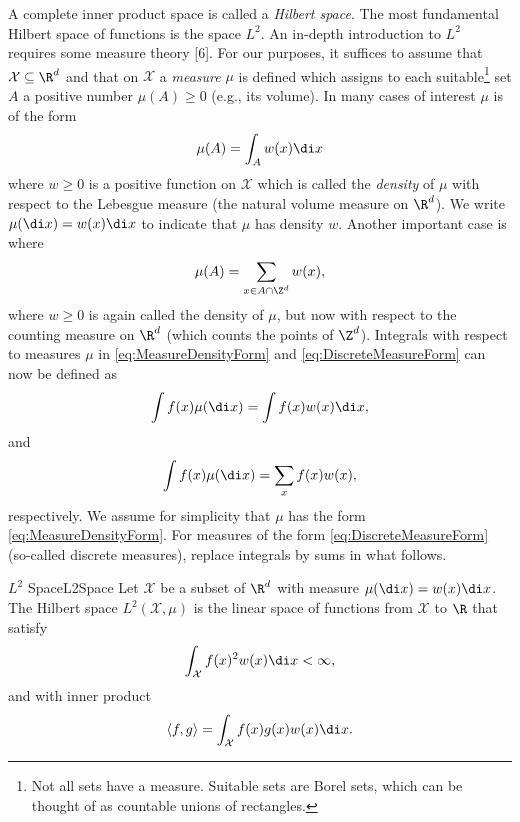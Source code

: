 A complete inner product space is called a \textit{Hilbert space}. The most fundamental Hilbert space of functions is the space $L^2$. An in-depth introduction to $L^2$ requires some measure theory [6]. For our purposes, it suffices to assume that $\mathcal{X} \subseteq \R^d$ and that on $\mathcal{X}$ a \textit{measure} $\mu$ is defined which assigns to each suitable\footnote{Not all sets have a measure. Suitable sets are Borel sets, which can be thought of as countable unions of rectangles.} set $A$ a positive number $\mu(A) \ge 0$ (e.g., its volume). In many cases of interest $\mu$ is of the form
\begin{equation}
	\mu(A) = \int_A w(x) \di x \label{eq:MeasureDensityForm}
\end{equation}
where $w \ge 0$ is a positive function on $\mathcal{X}$ which is called the \textit{density} of $\mu$ with respect to the Lebesgue measure (the natural volume measure on $\R^d$). We write $\mu(\di x) = w(x) \di x$ to indicate that $\mu$ has density $w$. Another important case is where
\begin{equation}
	\mu(A) = \sum_{x \in A \cap \Z^d} w(x), \label{eq:DiscreteMeasureForm}
\end{equation}
where $w \ge 0$ is again called the density of $\mu$, but now with respect to the counting measure on $\R^d$ (which counts the points of $\Z^d$). Integrals with respect to measures $\mu$ in \eqref{eq:MeasureDensityForm} and \eqref{eq:DiscreteMeasureForm} can now be defined as
\begin{equation*}
	\int f(x) \mu(\di x) = \int f(x) w(x) \di x,
\end{equation*}
and
\begin{equation*}
	\int f(x) \mu(\di x) = \sum_x f(x) w(x),
\end{equation*}
respectively. We assume for simplicity that $\mu$ has the form \eqref{eq:MeasureDensityForm}. For measures of the form \eqref{eq:DiscreteMeasureForm} (so-called discrete measures), replace integrals by sums in what follows.

\begin{defn}{$L^2$ Space}{L2Space}
	Let $\mathcal{X}$ be a subset of $\R^d$ with measure $\mu(\di x) = w(x) \di x$. The Hilbert space $L^2(\mathcal{X}, \mu)$ is the linear space of functions from $\mathcal{X}$ to $\R$ that satisfy
	\begin{equation}
		\int_{\mathcal{X}} f(x)^2 w(x) \di x < \infty, \label{eq:L2Integrability}
	\end{equation}
	and with inner product
	\begin{equation}
		\langle f, g \rangle = \int_{\mathcal{X}} f(x) g(x) w(x) \di x. \label{eq:L2InnerProduct}
	\end{equation}
\end{defn}

